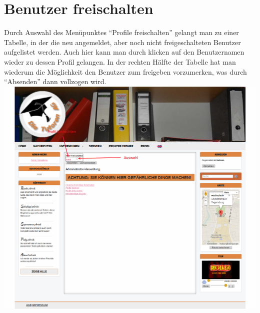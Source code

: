 
\section{Benutzer freischalten}
Durch Auswahl des Menüpunktes ``Profile freischalten'' gelangt man zu einer Tabelle, in der die neu angemeldet, aber noch nicht freigeschalteten Benutzer aufgelistet werden.
Auch hier kann man durch klicken auf den Benutzernamen wieder zu dessen Profil gelangen. In der rechten Hälfte der Tabelle hat man wiederum die Möglichkeit den Benutzer zum freigeben vorzumerken, was durch
``Absenden'' dann vollzogen wird.\\
\includegraphics[width=1\textwidth]{../Screenshots/de/admin/admin_chprofile}